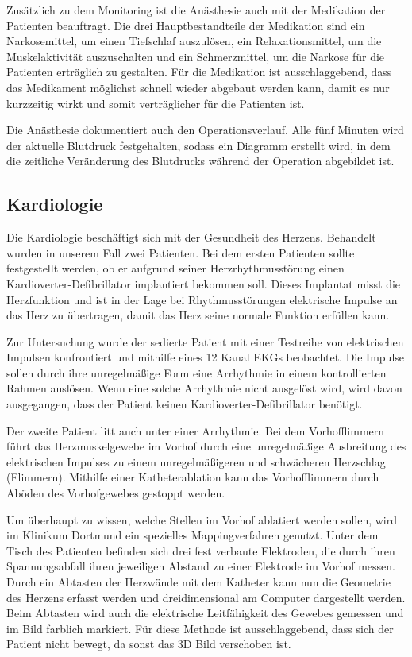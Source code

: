\documentclass[11pt,a4paper,titlepage]{scrartcl}
\begin{document}
Zusätzlich zu dem Monitoring ist die Anästhesie auch mit der Medikation der Patienten beauftragt.
Die drei Hauptbestandteile der Medikation sind ein Narkosemittel, um einen Tiefschlaf auszulösen, ein Relaxationsmittel, um die Muskelaktivität auszuschalten und ein Schmerzmittel, um die Narkose für die Patienten erträglich zu gestalten.
Für die Medikation ist ausschlaggebend, dass das Medikament möglichst schnell wieder abgebaut werden kann, damit es nur kurzzeitig wirkt und somit verträglicher für die Patienten ist. \medskip

Die Anästhesie dokumentiert auch den Operationsverlauf.
Alle fünf Minuten wird der aktuelle Blutdruck festgehalten, sodass ein Diagramm erstellt wird, in dem die zeitliche Veränderung des Blutdrucks während der Operation abgebildet ist.




\subsection{Kardiologie}

Die Kardiologie beschäftigt sich mit der Gesundheit des Herzens.
Behandelt wurden in unserem Fall zwei Patienten.
Bei dem ersten Patienten sollte festgestellt werden, ob er aufgrund seiner Herzrhythmusstörung einen Kardioverter-Defibrillator implantiert bekommen soll.
Dieses Implantat misst die Herzfunktion und ist in der Lage bei Rhythmusstörungen elektrische Impulse an das Herz zu übertragen, damit das Herz seine normale Funktion erfüllen kann. \medskip

Zur Untersuchung wurde der sedierte Patient mit einer Testreihe von elektrischen Impulsen konfrontiert und mithilfe eines 12 Kanal EKGs beobachtet.
Die Impulse sollen durch ihre unregelmäßige Form eine Arrhythmie in einem kontrollierten Rahmen auslösen.
Wenn eine solche Arrhythmie nicht ausgelöst wird, wird davon ausgegangen, dass der Patient keinen Kardioverter-Defibrillator benötigt. \medskip

Der zweite Patient litt auch unter einer Arrhythmie.
Bei dem Vorhofflimmern führt das Herzmuskelgewebe im Vorhof durch eine unregelmäßige Ausbreitung des elektrischen Impulses zu einem unregelmäßigeren und schwächeren Herzschlag (Flimmern).
Mithilfe einer Katheterablation kann das Vorhofflimmern durch Aböden des Vorhofgewebes gestoppt werden. \medskip

Um überhaupt zu wissen, welche Stellen im Vorhof ablatiert werden sollen, wird im Klinikum Dortmund ein spezielles Mappingverfahren genutzt.
Unter dem Tisch des Patienten befinden sich drei fest verbaute Elektroden, die durch ihren Spannungsabfall ihren jeweiligen Abstand zu einer Elektrode im Vorhof messen.
Durch ein Abtasten der Herzwände mit dem Katheter kann nun die Geometrie des Herzens erfasst werden und dreidimensional am Computer dargestellt werden.
Beim Abtasten wird auch die elektrische Leitfähigkeit des Gewebes gemessen und im Bild farblich markiert.
Für diese Methode ist ausschlaggebend, dass sich der Patient nicht bewegt, da sonst das 3D Bild verschoben ist. \medskip
\end{document}
